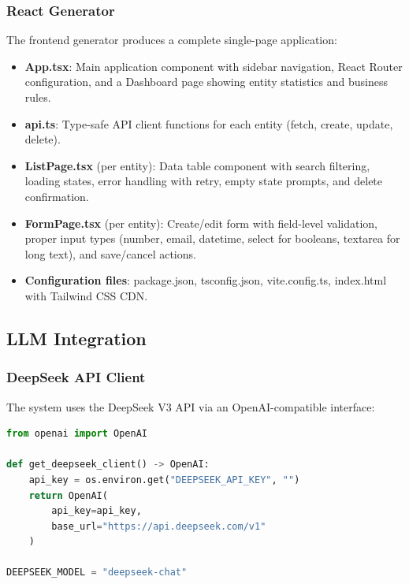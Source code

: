 \documentclass[11pt,a4paper]{article}
\begin{document}
\subsubsection{React Generator}

The frontend generator produces a complete single-page application:

\begin{itemize}
    \item \textbf{App.tsx}: Main application component with sidebar navigation, React Router configuration, and a Dashboard page showing entity statistics and business rules.
    \item \textbf{api.ts}: Type-safe API client functions for each entity (fetch, create, update, delete).
    \item \textbf{ListPage.tsx} (per entity): Data table component with search filtering, loading states, error handling with retry, empty state prompts, and delete confirmation.
    \item \textbf{FormPage.tsx} (per entity): Create/edit form with field-level validation, proper input types (number, email, datetime, select for booleans, textarea for long text), and save/cancel actions.
    \item \textbf{Configuration files}: package.json, tsconfig.json, vite.config.ts, index.html with Tailwind CSS CDN.
\end{itemize}

\subsection{LLM Integration}

\subsubsection{DeepSeek API Client}

The system uses the DeepSeek V3 API via an OpenAI-compatible interface:

\begin{lstlisting}[language=Python, caption={DeepSeek API client configuration}, label={lst:client}]
from openai import OpenAI

def get_deepseek_client() -> OpenAI:
    api_key = os.environ.get("DEEPSEEK_API_KEY", "")
    return OpenAI(
        api_key=api_key,
        base_url="https://api.deepseek.com/v1"
    )

DEEPSEEK_MODEL = "deepseek-chat"
\end{lstlisting}
\end{document}
